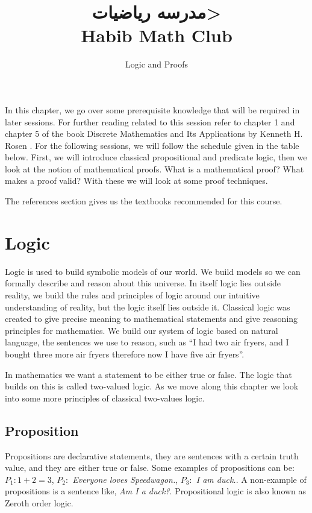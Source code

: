 \documentclass[12pt]{exam}
\title{\Huge \<مدرسه رياضيات>
\\\vspace*{0.5cm} \huge Habib Math Club}
\author{\Large Logic and Proofs}
\date{\term}
\begin{document}
\maketitle

In this chapter, we go over some prerequisite knowledge that will be required in later sessions. For further reading related to this session refer to chapter 1 and chapter 5 of the book Discrete Mathematics and Its Applications by Kenneth H. Rosen \cite{Rosen19}.
For the following sessions, we will follow the schedule given in the table below.
First, we will introduce classical propositional and predicate logic, then we look at the notion of mathematical proofs. What is a mathematical proof? What makes a proof valid? With these we will look at some proof techniques.

The references section gives us the textbooks recommended for this course.

\section*{Logic}
Logic is used to build symbolic models of our world. We build models so we can formally describe and reason about this universe. 
In itself logic lies outside reality, we build the rules and principles of logic around our intuitive understanding of reality, but the logic itself lies outside it.
Classical logic was created to give precise meaning to mathematical statements and give reasoning principles for mathematics. We build our system of logic based on natural language, the sentences we use to reason, 
such as ``I had two air fryers, and I bought three more air fryers therefore now I have five air fryers''. 

In mathematics we want a statement to be either true or false. The logic that builds on this is called two-valued logic. 
As we move along this chapter we look into some more principles of classical two-values logic.



\subsection*{Proposition}
Propositions are declarative statements, they are sentences with a certain truth value, and they are either true or false.
Some examples of propositions can be: \emph{$P_1: 1+ 2 = 3$}, \emph{$P_2:$ Everyone loves Speedwagon.}, \emph{$P_3:$ I am duck.}.
A non-example of propositions is a sentence like, \emph{Am I a duck?}.
Propositional logic is also known as Zeroth order logic.
\end{document}
